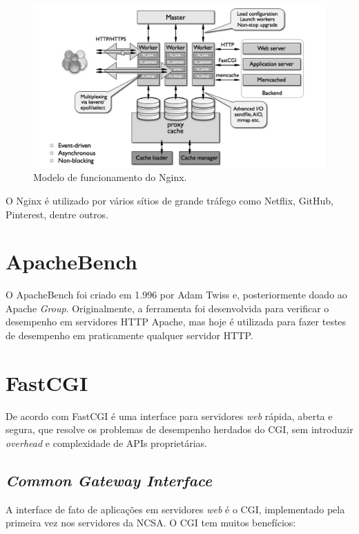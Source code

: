 \begin{figure}[h!]
	\centering
	\includegraphics[scale=1]{figuras/nginx-how-it-works} 
	\caption{Modelo de funcionamento do Nginx.}
	\label{fig:nginx-comofunciona}
\end{figure}

O Nginx é utilizado por vários sítios de grande tráfego como Netflix, GitHub, 
Pinterest, dentre outros.

\section{ApacheBench}
O ApacheBench foi criado em 1.996 por Adam Twiss e, posteriormente doado ao 
Apache \textit{Group}. Originalmente, a ferramenta foi desenvolvida para 
verificar o desempenho em servidores HTTP Apache, mas hoje é utilizada para 
fazer testes de desempenho em  praticamente qualquer servidor HTTP.

\section{FastCGI}

De acordo com \cite{fastcgi} FastCGI é uma interface para servidores 
\textit{web} rápida, aberta e segura, que resolve os problemas de desempenho 
herdados do CGI, sem introduzir \textit{overhead} e complexidade de APIs 
proprietárias.

\subsection{\textit{Common Gateway Interface}}

A interface de fato de aplicações em servidores \textit{web} é o CGI, 
implementado pela primeira vez nos servidores da NCSA. O CGI tem muitos 
benefícios:

